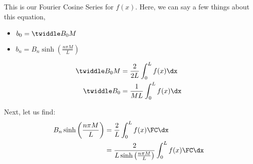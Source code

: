 \begin{enumerate}
  This is our Fourier Cosine Series for $f(x)$.
  Here, we can say a few things about this equation,
  \begin{itemize}
    \item $b_0 = \twiddle B_0 M$
    \item $b_n = B_n \sinh\left( \frac{n \pi M}{L} \right)$
  \end{itemize}
  \begin{align}
    \twiddle B_0 M & = \frac{2}{2L} \int^L_0 f(x) \dx\\
    \twiddle B_0 & = \frac{1}{ML} \int^L_0 f(x) \dx
  \end{align}

  Next, let us find:
  \begin{align}
    B_n \sinh\left( \frac{n \pi M}{L} \right)
    & = \frac{2}{L} \int^L_0 f(x) \FC \dx\\
    & = \frac{2}{L \sinh\left( \frac{n \pi M}{L} \right)} \int^L_0 f(x) \FC \dx
  \end{align}
\end{enumerate}

